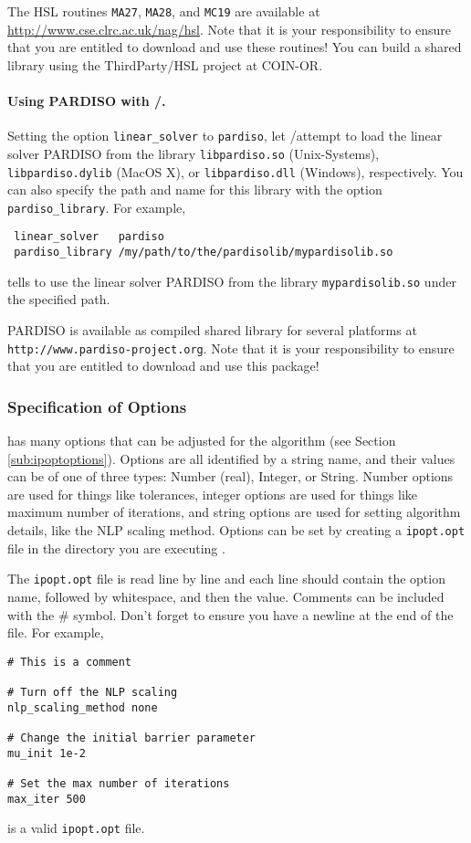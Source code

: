 The HSL routines \texttt{MA27}, \texttt{MA28}, and \texttt{MC19} are available at \url{http://www.cse.clrc.ac.uk/nag/hsl}.
Note that it is your responsibility to ensure that you are entitled to download and use these routines!
You can build a shared library using the ThirdParty/HSL project at COIN-OR.

\paragraph{Using PARDISO with \GAMS/\IPOPT.}
Setting the option \texttt{linear\_solver} to \texttt{pardiso}, let \GAMS/\IPOPT attempt to load the linear solver PARDISO from the library \texttt{libpardiso.so} (Unix-Systems), \texttt{libpardiso.dylib} (MacOS X), or \texttt{libpardiso.dll} (Windows), respectively.
You can also specify the path and name for this library with the option \texttt{pardiso\_library}.
For example,
\begin{verbatim}
 linear_solver   pardiso
 pardiso_library /my/path/to/the/pardisolib/mypardisolib.so
\end{verbatim}
tells \IPOPT to use the linear solver PARDISO from the library \texttt{mypardisolib.so} under the specified path.

PARDISO is available as compiled shared library for several platforms at \texttt{http://www.pardiso-project.org}.
Note that it is your responsibility to ensure that you are entitled to download and use this package!


\subsubsection{Specification of Options}
\label{sub:ipoptoptionspec}

\IPOPT has many options that can be adjusted for the algorithm (see Section \ref{sub:ipoptoptions}).
Options are all identified by a string name, and their values can be of one of three types: Number (real), Integer, or String.
Number options are used for things like tolerances, integer options are used for things like maximum number of iterations, and string options are used for setting algorithm details, like the NLP scaling method.
Options can be set by creating a \texttt{ipopt.opt} file in the directory you are executing \IPOPT.

The \texttt{ipopt.opt} file is read line by line and each line should contain the option name, followed by whitespace, and then the value.
Comments can be included with the \# symbol. Don't forget to ensure you have a newline at the end of the file. For example,
\begin{verbatim}
# This is a comment

# Turn off the NLP scaling
nlp_scaling_method none

# Change the initial barrier parameter
mu_init 1e-2

# Set the max number of iterations
max_iter 500
\end{verbatim}
is a valid \texttt{ipopt.opt} file.

